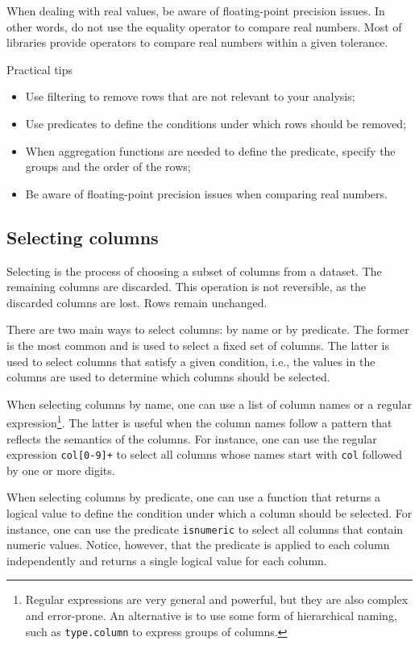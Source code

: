 When dealing with real values, be aware of floating-point precision issues.  In other
words, do not use the equality operator to compare real numbers.  Most of libraries
provide operators to compare real numbers within a given tolerance.

\begin{mainbox}{Practical tips}
  \begin{itemize}
    \item Use filtering to remove rows that are not relevant to your analysis;
    \item Use predicates to define the conditions under which rows should be removed;
    \item When aggregation functions are needed to define the predicate, specify the groups and
      the order of the rows;
    \item Be aware of floating-point precision issues when comparing real numbers.
  \end{itemize}
\end{mainbox}

\subsection{Selecting columns}

Selecting is the process of choosing a subset of columns from a dataset.  The remaining
columns are discarded.  This operation is not reversible, as the discarded columns are
lost.  Rows remain unchanged.

There are two main ways to select columns: by name or by predicate.  The former is the
most common and is used to select a fixed set of columns.  The latter is used to select
columns that satisfy a given condition, i.e., the values in the columns are used to
determine which columns should be selected.

When selecting columns by name, one can use a list of column names or a regular
expression\footnote{Regular expressions are very general and powerful, but they are also
complex and error-prone.  An alternative is to use some form of hierarchical naming,
such as \texttt{type.column} to express groups of columns.}.
The latter is useful when the column names follow a pattern that reflects the semantics of
the columns.  For instance,
one can use the regular expression \texttt{col[0-9]+} to select all columns whose names
start with \texttt{col} followed by one or more digits.

When selecting columns by predicate, one can use a function that returns a logical value
to define the condition under which a column should be selected.  For instance, one can
use the predicate \texttt{isnumeric} to select all columns that contain numeric values.
Notice, however, that the predicate is applied to each column independently and returns a
single logical value for each column.

